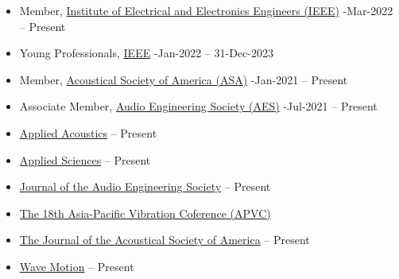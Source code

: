 \documentclass[10pt,a4paper,ragged2e,withhyper]{altacv}
\newcommand{\hrefhl}[2]{{\color{accent}\href{#1}{#2}}}
\begin{document}
\begin{itemize}
    \item Member, \hrefhl{https://www.ieee.org/membership/index.html}{Institute of Electrical and Electronics Engineers (IEEE)} \hfill {}-Mar-2022 -- Present

    \item Young Professionals, \hrefhl{https://yp.ieee.org/}{IEEE} 
        \hfill {}-Jan-2022 -- 31-Dec-2023

    \item Member, \hrefhl{https://acousticalsociety.org/asa-membership/}{Acoustical Society of America (ASA)} 
        \hfill {}-Jan-2021 -- Present

    \item Associate Member, \hrefhl{https://aes2.org/aes-membership-overview/}{Audio Engineering Society (AES)} 
        \hfill {}-Jul-2021 -- Present
\end{itemize}

\begin{itemize}
    \item \hrefhl{https://www.journals.elsevier.com/applied-acoustics}{Applied Acoustics} \hfill {} -- Present

    \item \hrefhl{https://www.mdpi.com/journal/applsci}{Applied Sciences} \hfill {} -- Present


    \item \hrefhl{https://www.aes.org/journal/}{Journal of the Audio Engineering Society} \hfill {} -- Present

    \item \hrefhl{https://www.amazon.com/Vibration-Engineering-Sustainable-Future-Passive/dp/3030476170}{The 18th Asia-Pacific Vibration Coference (APVC)} \hfill {} 
    \item \hrefhl{https://asa.scitation.org/journal/jas}{The Journal of the Acoustical Society of America} \hfill {} -- Present

    \item \hrefhl{https://www.sciencedirect.com/journal/wave-motion}{Wave Motion} \hfill {} -- Present

\end{itemize}


\end{document}
